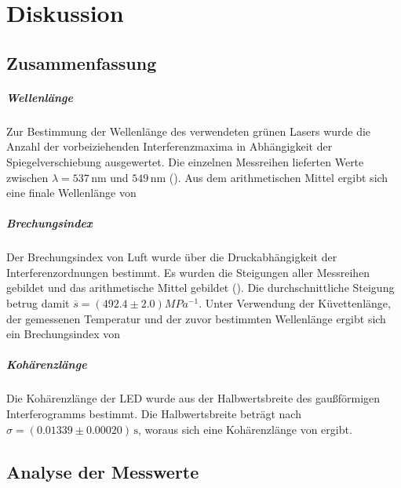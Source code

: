 \chapter{Diskussion}
\label{ch:Diskussion}

\section{Zusammenfassung}
\label{sec:Zusammenfassung}

\paragraph{Wellenlänge}
Zur Bestimmung der Wellenlänge des verwendeten grünen Lasers wurde die Anzahl der vorbeiziehenden Interferenzmaxima in Abhängigkeit der Spiegelverschiebung ausgewertet. Die einzelnen Messreihen lieferten Werte zwischen \(\lambda = 537\,\mathrm{nm}\) und \(549\,\mathrm{nm}\) (). Aus dem arithmetischen Mittel ergibt sich eine finale Wellenlänge von

\paragraph{Brechungsindex}
Der Brechungsindex von Luft wurde über die Druckabhängigkeit der Interferenzordnungen bestimmt. Es wurden die Steigungen aller Messreihen gebildet und das arithmetische Mittel gebildet ().
Die durchschnittliche Steigung betrug damit $\overline{s} = (492.4 \pm 2.0) MPa^{-1}$.
Unter Verwendung der Küvettenlänge, der gemessenen Temperatur und der zuvor bestimmten Wellenlänge ergibt sich ein Brechungsindex von 

\paragraph{Kohärenzlänge}

Die Kohärenzlänge der LED wurde aus der Halbwertsbreite des gaußförmigen Interferogramms bestimmt. Die Halbwertsbreite beträgt nach  \(\sigma = (0.01339 \pm 0.00020)\,\mathrm{s}\), woraus sich eine Kohärenzlänge von 
ergibt.

\section{Analyse der Messwerte}
\label{sec:Analyse}

